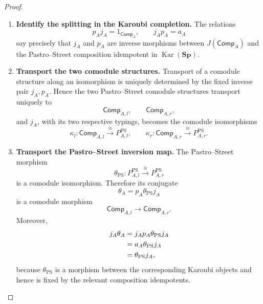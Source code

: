 \documentclass[oneside]{article}
\newcommand{\Sp}{\mathbf{Sp}}
\newcommand{\Kar}{\operatorname{Kar}}
\theoremstyle{plain}
\theoremstyle{definition}
\theoremstyle{remark}
\begin{document}
\begin{proof}
    \leavevmode
    \begin{enumerate}[beginpenalty=10000]
        \item \textbf{Identify the splitting in the Karoubi completion.} The relations
        \[
            p_Aj_A=1_{\mathsf{Comp}_A},
            \qquad
            j_Ap_A=a_A
        \]
        say precisely that \(j_A\) and \(p_A\) are inverse morphisms between \(J(\mathsf{Comp}_A)\) and the Pastro--Street composition idempotent in \(\Kar(\Sp)\).

        \item \textbf{Transport the two comodule structures.} Transport of a comodule structure along an isomorphism is uniquely determined by the fixed inverse pair \(j_A,p_A\). Hence the two Pastro--Street comodule structures transport uniquely to
        \[
            \mathsf{Comp}_{A,l},
            \qquad
            \mathsf{Comp}_{A,r},
        \]
        and \(j_A\), with its two respective typings, becomes the comodule isomorphisms
        \[
            \kappa_l:
            \mathsf{Comp}_{A,l}
            \xrightarrow{\cong}
            P_{A,l}^{\mathrm{PS}},
            \qquad
            \kappa_r:
            \mathsf{Comp}_{A,r}
            \xrightarrow{\cong}
            P_{A,r}^{\mathrm{PS}}.
        \]

        \item \textbf{Transport the Pastro--Street inversion map.} The Pastro--Street morphism
        \[
            \theta_{\mathrm{PS}}:
            P_{A,l}^{\mathrm{PS}}
            \xrightarrow{\cong}
            P_{A,r}^{\mathrm{PS}}
        \]
        is a comodule isomorphism. Therefore its conjugate
        \[
            \theta_A
            =
            p_A\theta_{\mathrm{PS}}j_A
        \]
        is a comodule morphism
        \[
            \mathsf{Comp}_{A,l}
            \longrightarrow
            \mathsf{Comp}_{A,r}.
        \]
        Moreover,
        \begin{align}
            j_A\theta_A
            &=
            j_Ap_A\theta_{\mathrm{PS}}j_A
            \notag\\
            &=
            a_A\theta_{\mathrm{PS}}j_A
            \notag\\
            &=
            \theta_{\mathrm{PS}}j_A,
            \label{eq:cgqg-theta-transport-intertwining}
        \end{align}
        because \(\theta_{\mathrm{PS}}\) is a morphism between the corresponding Karoubi objects and hence is fixed by the relevant composition idempotents.


\end{enumerate}
\end{proof}
\end{document}
